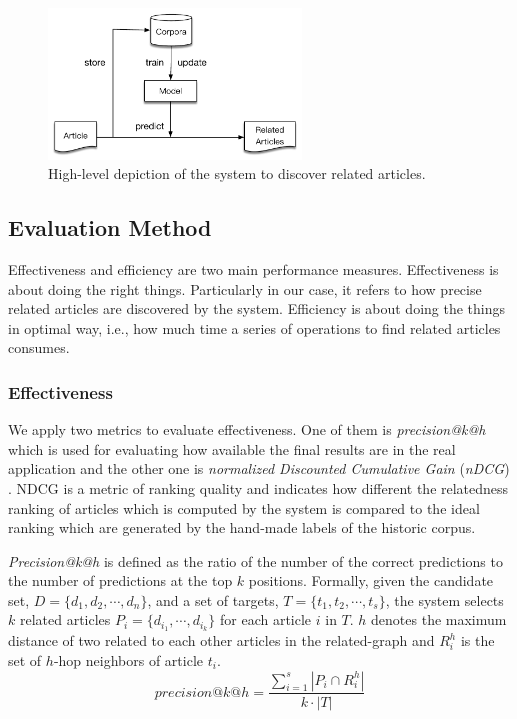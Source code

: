 \begin{figure}[!htb]
    \centering
    \includegraphics[width=0.6\textwidth]{fig/high-level.pdf}
    \caption{High-level depiction of the system to discover related articles. }
    \label{fig:highlevel}
\end{figure}
\bigbreak
\subsection{Evaluation Method}
\label{sec:3.3}

Effectiveness and efficiency are two main performance measures. Effectiveness is about doing the right things. Particularly in our case, it refers to how precise related articles are discovered by the system. Efficiency is about doing the things in optimal way, i.e., how much time a series of operations to find related articles consumes. 

\subsubsection{Effectiveness}

We apply two metrics to evaluate effectiveness. One of them is \textit{precision@k@h} \citep{introduction2IR} which is used for evaluating how available the final results are in the real application and the other one is \textit{normalized Discounted Cumulative Gain} (\textit{nDCG}) \citep{jarvelin2002cumulated}. NDCG is a metric of ranking quality and indicates how different the relatedness ranking of articles which is computed by the system is compared to the ideal ranking which are generated by the hand-made labels of the historic corpus. 

\textit{Precision@k@h} is defined as the ratio of the number of the correct predictions to the number of predictions at the top $k$ positions. Formally, given the candidate set, $D = \{d_1, d_2, \cdots, d_n\}$, and a set of targets, $T = \{t_1, t_2, \cdots, t_s\}$, the system selects $k$ related articles $P_i = \{d_{i_1}, \cdots, d_{i_k}\}$ for each article $i$ in $T$. $h$ denotes the maximum distance of two related to each other articles in the related-graph and $R_i^h$ is the set of $h$-hop neighbors of article $t_i$. 
\begin{equation}
    precision@k@h = \frac{\sum_{i=1}^s{|P_i \cap R_i^h|}}{k \cdot |T|}
\end{equation}

